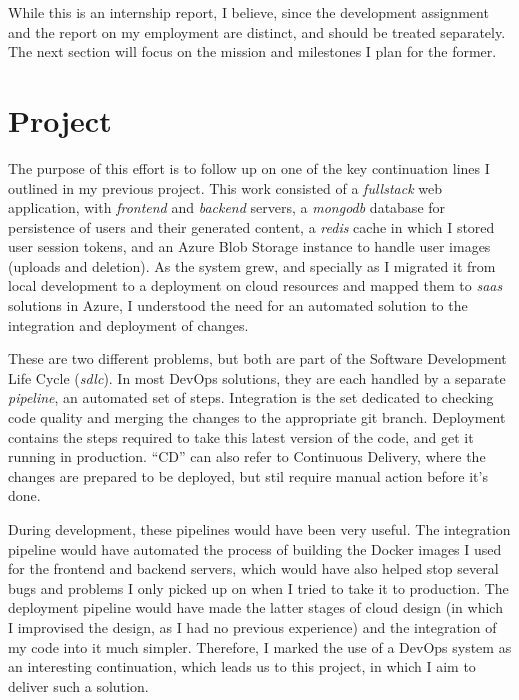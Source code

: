 \documentclass[11pt]{article}
\begin{document}
\begin{flushleft}
While this is an internship report, I believe, since the development assignment and the report on my employment are distinct, and should be treated separately. The next section will focus on the mission and milestones I plan for the former.
\linebreak



\clearpage
\section{Project}
The purpose of this effort is to follow up on one of the key continuation lines I outlined in my previous project. This work consisted of a \textit{\gls{fullstack}} web application, with \textit{\gls{frontend}} and \textit{\gls{backend}} servers, a \textit{\gls{mongodb}} database for persistence of users and their generated content, a \textit{\gls{redis}} cache in which I stored user session tokens, and an Azure Blob Storage instance to handle user images (uploads and deletion). As the system grew, and specially as I migrated it from local development to a deployment on cloud resources and mapped them to \textit{\acrshort{saas}} solutions in Azure, I understood the need for an automated solution to the integration and deployment of changes.
\linebreak

These are two different problems, but both are part of the Software Development Life Cycle (\textit{\acrshort{sdlc}}). In most DevOps solutions, they are each handled by a separate \textit{\gls{pipeline}}, an automated set of steps. Integration is the set dedicated to checking code quality and merging the changes to the appropriate git branch. Deployment contains the steps required to take this latest version of the code, and get it running in production. ``CD'' can also refer to Continuous Delivery, where the changes are prepared to be deployed, but stil require manual action before it's done.
\linebreak

During development, these pipelines would have been very useful. The integration pipeline would have automated the process of building the Docker images I used for the frontend and backend servers, which would have also helped stop several bugs and problems I only picked up on when I tried to take it to production. The deployment pipeline would have made the latter stages of cloud design (in which I improvised the design, as I had no previous experience) and the integration of my code into it much simpler. Therefore, I marked the use of a DevOps system as an interesting continuation, which leads us to this project, in which I aim to deliver such a solution.
\linebreak


\end{flushleft}
\end{document}

